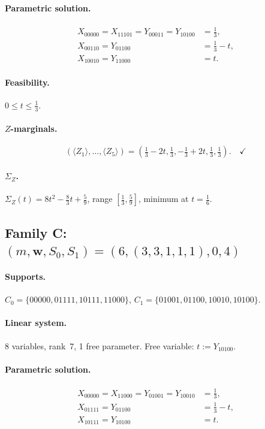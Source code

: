 \documentclass{article}
\newcommand{\SigZ}{\Sigma_Z}
\begin{document}
\paragraph{Parametric solution.}
\[
\begin{aligned}
X_{00000}=X_{11101}=Y_{00011}=Y_{10100} &= \tfrac{1}{3},\\
X_{00110}=Y_{01100} &= \tfrac{1}{3}-t,\\
X_{10010}=Y_{11000} &= t.
\end{aligned}
\]

\paragraph{Feasibility.} $0\le t\le \frac{1}{3}$. \checkmark

\paragraph{$Z$-marginals.}
\[
(\langle Z_1\rangle,\dots,\langle Z_5\rangle)
= (\tfrac13-2t, \tfrac13, {-}\tfrac13+2t, \tfrac13, \tfrac13). \quad\checkmark
\]

\paragraph{$\SigZ$.}
$\SigZ(t)=8t^2-\frac{8}{3}t+\frac{5}{9}$, range $[\tfrac13,\tfrac59]$, minimum at $t=\tfrac16$. \checkmark

\subsection{Family C: $(m,\mathbf{w},S_0,S_1)=(6,(3,3,1,1,1),0,4)$}

\paragraph{Supports.}
$C_0=\{00000, 01111, 10111, 11000\}$,\quad
$C_1=\{01001, 01100, 10010, 10100\}$.

\paragraph{Linear system.}
8 variables, rank~7, 1 free parameter.
Free variable: $t:=Y_{10100}$.

\paragraph{Parametric solution.}
\[
\begin{aligned}
X_{00000}=X_{11000}=Y_{01001}=Y_{10010} &= \tfrac{1}{3},\\
X_{01111}=Y_{01100} &= \tfrac{1}{3}-t,\\
X_{10111}=Y_{10100} &= t.
\end{aligned}
\]
\end{document}
